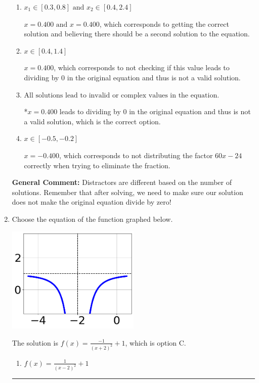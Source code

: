 \documentclass{extbook}[14pt]
\newcommand{\litem}[1]{\item #1

\rule{\textwidth}{0.4pt}}
\begin{document}
\begin{enumerate}
{\begin{enumerate}[label=\Alph*.]
$x = -0.400 \text{ and } x = 0.400$, which corresponds to getting the correct solution and believing there should be a second solution to the equation.
\item \( x_1 \in [0.3, 0.8] \text{ and } x_2 \in [0.4,2.4] \)

$x = 0.400 \text{ and } x = 0.400$, which corresponds to getting the correct solution and believing there should be a second solution to the equation.
\item \( x \in [0.4,1.4] \)

$x = 0.400$, which corresponds to not checking if this value leads to dividing by 0 in the original equation and thus is not a valid solution.
\item \( \text{All solutions lead to invalid or complex values in the equation.} \)

*$x = 0.400$ leads to dividing by 0 in the original equation and thus is not a valid solution, which is the correct option.
\item \( x \in [-0.5,-0.2] \)

$x = -0.400$, which corresponds to not distributing the factor $60x -24$ correctly when trying to eliminate the fraction.
\end{enumerate}

\textbf{General Comment:} Distractors are different based on the number of solutions. Remember that after solving, we need to make sure our solution does not make the original equation divide by zero!
}
\litem{
Choose the equation of the function graphed below.

\begin{center}
    \includegraphics[width=0.5\textwidth]{../Figures/rationalGraphToEquationCopyC.png}
\end{center}


The solution is \( f(x) = \frac{-1}{(x + 2)^2} + 1 \), which is option C.\begin{enumerate}[label=\Alph*.]
\item \( f(x) = \frac{1}{(x - 2)^2} + 1 \)


\end{enumerate}}
\end{enumerate}
\end{document}
